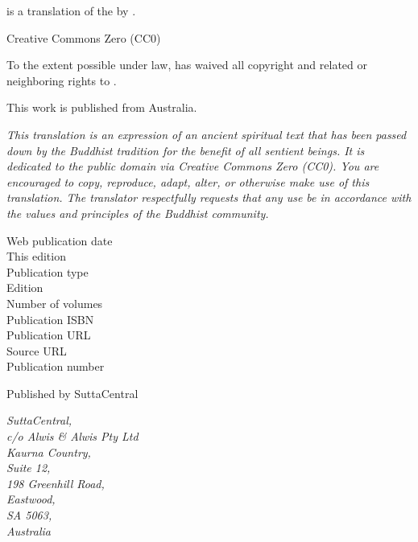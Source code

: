 
\begin{footnotesize}

\textit{} is a translation of the  by .

\medskip

Creative Commons Zero (CC0)

To the extent possible under law,  has waived all copyright and related or neighboring rights to \textit{}.

\medskip

This work is published from Australia.

\begin{center}
\textit{This translation is an expression of an ancient spiritual text that has been passed down by the Buddhist tradition for the benefit of all sentient beings. It is dedicated to the public domain via Creative Commons Zero (CC0). You are encouraged to copy, reproduce, adapt, alter, or otherwise make use of this translation. The translator respectfully requests that any use be in accordance with the values and principles of the Buddhist community.}
\end{center}

\medskip

\begin{description}
    \item[Web publication date] 
    \item[This edition] 
    \item[Publication type] 
    \item[Edition] 
    \item[Number of volumes] 
    \item[Publication ISBN] 
    \item[Publication URL] 
    \item[Source URL] 
    \item[Publication number] 
\end{description}

\medskip

Published by SuttaCentral

\medskip

\textit{SuttaCentral,\\
c/o Alwis \& Alwis Pty Ltd\\
Kaurna Country,\\
Suite 12,\\
198 Greenhill Road,\\
Eastwood,\\
SA 5063,\\
Australia}

\end{footnotesize}

\newpage
